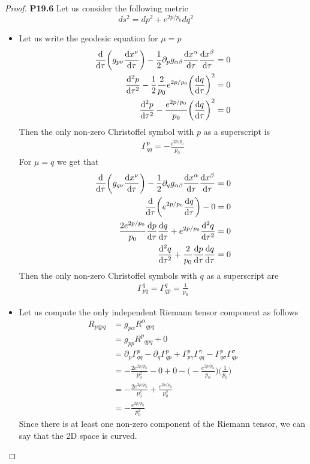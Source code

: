 \documentclass[11pt]{article}
\theoremstyle{definition}
\begin{document}
\cleardoublepage
\begin{proof}{\textbf{P19.6}}
Let us consider the following metric
$$ds^2 = dp^2 + e^{2p/p_0}dq^2$$
\begin{itemize}
\item [\textbf{a.}] Let us write the geodesic equation for $\mu = p$
\begin{align*}
    \dv{\tau}(g_{p\nu}\dv{x^{\nu}}{\tau})
    - \frac{1}{2}\partial_{p}g_{\alpha\beta}\dv{x^\alpha}{\tau}\dv{x^\beta}{\tau}
    &= 0\\
    \dv[2]{p}{\tau}
    - \frac{1}{2}\frac{2}{p_0}e^{2p/p_0}\bigg(\dv{q}{\tau}\bigg)^2
    &= 0\\
    \dv[2]{p}{\tau}
    - \frac{e^{2p/p_0}}{p_0}\bigg(\dv{q}{\tau}\bigg)^2
    &= 0
\end{align*}
Then the only non-zero Christoffel symbol with $p$ as a superscript is
\begin{align*}
    \Gamma^p_{qq} = - \frac{e^{2p/p_0}}{p_0}
\end{align*}
For $\mu = q$ we get that
\begin{align*}
    \dv{\tau}(g_{q\nu}\dv{x^{\nu}}{\tau})
    - \frac{1}{2}\partial_{q}g_{\alpha\beta}\dv{x^\alpha}{\tau}\dv{x^\beta}{\tau}
    &= 0\\
    \dv{\tau}(e^{2p/p_0}\dv{q}{\tau}) - 0
    &= 0\\
    \frac{2e^{2p/p_0}}{p_0}\dv{p}{\tau}\dv{q}{\tau} + e^{2p/p_0}\dv[2]{q}{\tau}
    &= 0\\
    \dv[2]{q}{\tau} + \frac{2}{p_0}\dv{p}{\tau}\dv{q}{\tau}
    &= 0
\end{align*}
Then the only non-zero Christoffel symbols with $q$ as a superscript are
\begin{align*}
    \Gamma^q_{pq} = \Gamma^q_{qp} = \frac{1}{p_0}
\end{align*}

\item [\textbf{b.}] Let us compute the only independent Riemann tensor component
as follows
\begin{align*}
    R_{pqpq} &= g_{p\alpha}{R^\alpha}_{qpq}\\
    &= g_{pp}{R^p}_{qpq} + 0\\
    &= \partial_p\Gamma^p_{qq} - \partial_q\Gamma^p_{qp}
    + \Gamma^p_{p\gamma} \Gamma^\gamma_{qq}
    - \Gamma^p_{q\sigma} \Gamma^\sigma_{qp}\\
    &= - \frac{2e^{2p/p_0}}{p_0^2} - 0  + 0
    - \bigg(- \frac{e^{2p/p_0}}{p_0}\bigg)\bigg(\frac{1}{p_0}\bigg)\\
    &= - \frac{2e^{2p/p_0}}{p_0^2} + \frac{e^{2p/p_0}}{p_0^2}\\
    &= -\frac{e^{2p/p_0}}{p_0^2}
\end{align*}
Since there is at least one non-zero component of the Riemann tensor,
we can say that the 2D space is curved.
\end{itemize}
\end{proof}
\end{document}
